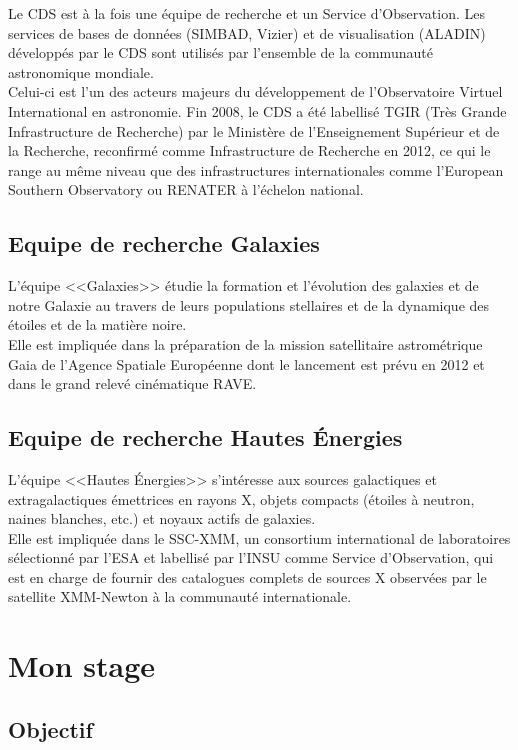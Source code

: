 \documentclass[a4paper,french,12pt]{article}
\begin{document}
		Le CDS est à la fois une équipe de recherche et un Service d’Observation.
		Les services de bases de données (SIMBAD, Vizier) et de visualisation (ALADIN) développés par le CDS
		sont utilisés par l’ensemble de la communauté astronomique mondiale. \\
		Celui-ci est l'un des acteurs majeurs du développement de l'Observatoire Virtuel International en astronomie.
		Fin 2008, le CDS a été labellisé TGIR (Très Grande Infrastructure de Recherche) par le Ministère de l'Enseignement Supérieur et de la Recherche, 
		reconfirmé comme Infrastructure de Recherche en 2012, ce qui le range au même niveau que des infrastructures internationales
		comme l’European Southern Observatory ou RENATER à l’échelon national.

	\subsection{Equipe de recherche Galaxies}
	
		L’équipe <<Galaxies>> étudie la formation et l’évolution des galaxies et de notre Galaxie 
		au travers de leurs populations stellaires et de la dynamique des étoiles et de la matière noire. \\
		Elle est impliquée dans la préparation de la mission satellitaire astrométrique Gaia de l’Agence Spatiale Européenne 
		dont le lancement est prévu en 2012 et dans le grand relevé cinématique RAVE. 
	
	\subsection{Equipe de recherche Hautes Énergies} 
	
		L’équipe <<Hautes Énergies>> s’intéresse aux sources galactiques et extragalactiques émettrices en rayons X,
		objets compacts (étoiles à neutron, naines blanches, etc.) et noyaux actifs de galaxies.\\
		Elle est impliquée dans le SSC-XMM, un consortium international de laboratoires sélectionné par l’ESA
		et labellisé par l’INSU comme Service d’Observation, qui est en charge de fournir des catalogues complets
		de sources X observées par le satellite XMM-Newton à la communauté internationale. 

\section{Mon stage}

	\subsection{Objectif}	
	
\end{document}
